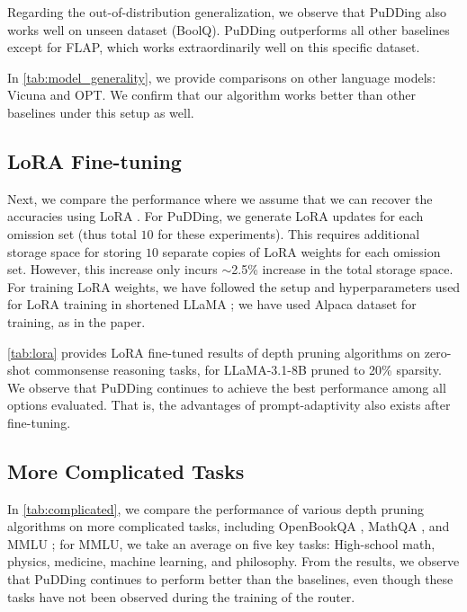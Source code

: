 Regarding the out-of-distribution generalization, we observe that PuDDing also works well on unseen dataset (BoolQ). PuDDing outperforms all other baselines except for FLAP, which works extraordinarily well on this specific dataset.

In \cref{tab:model_generality}, we provide comparisons on other language models: Vicuna and OPT. We confirm that our algorithm works better than other baselines under this setup as well. 

\subsection{LoRA Fine-tuning}

Next, we compare the performance where we assume that we can recover the accuracies using LoRA \citep{hulora}. For PuDDing, we generate LoRA updates for each omission set (thus total $10$ for these experiments). This requires additional storage space for storing $10$ separate copies of LoRA weights for each omission set. However, this increase only incurs $\sim$2.5\% increase in the total storage space.
For training LoRA weights, we have followed the setup and hyperparameters used for LoRA training in shortened LLaMA \citep{kim2024shortened}; we have used Alpaca dataset \citep{taori2023alpaca} for training, as in the paper.

\cref{tab:lora} provides LoRA fine-tuned results of depth pruning algorithms on zero-shot commonsense reasoning tasks, for LLaMA-3.1-8B pruned to 20\% sparsity. We observe that PuDDing continues to achieve the best performance among all options evaluated. That is, the advantages of prompt-adaptivity also exists after fine-tuning.

\subsection{More Complicated Tasks}

In \cref{tab:complicated}, we compare the performance of various depth pruning algorithms on more complicated tasks, including OpenBookQA \citep{mihaylov2018openbookqa}, MathQA \citep{amini2019mathqa}, and MMLU \citep{hendrycksmmlu}; for MMLU, we take an average on five key tasks: High-school math, physics, medicine, machine learning, and philosophy. From the results, we observe that PuDDing continues to perform better than the baselines, even though these tasks have not been observed during the training of the router.
